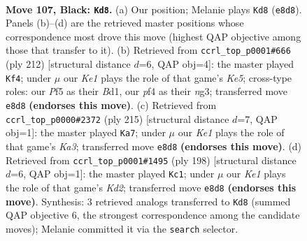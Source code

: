 \documentclass[11pt]{article}
\begin{document}
\clearpage

\begin{figure}[p]\centering
\begin{subfigure}{0.46\textwidth}\centering
\resizebox{\linewidth}{!}{%
\newchessgame
\chessboard[
  setfen={4k1K1/8/8/1b3p2/5P2/8/8/8 b - - 29 107},
  showmover=false,
  pgfstyle=straightmove, color=movearrow, markmove={e8-d8}
]}
\caption{}
\end{subfigure}\hfill
\begin{subfigure}{0.46\textwidth}\centering
\resizebox{\linewidth}{!}{%
\newchessgame
\chessboard[
  setfen={7B/4k3/8/4K3/8/6n1/8/3B4 w - - 11 107},
  showmover=false,
  pgfstyle=straightmove, color=movearrow, markmove={e5-f4}
]}
\caption{}
\end{subfigure}
\\[4pt]
\begin{subfigure}{0.46\textwidth}\centering
\resizebox{\linewidth}{!}{%
\newchessgame
\chessboard[
  setfen={8/6b1/k7/8/2K5/p4N2/P7/8 b - - 73 108},
  showmover=false,
  pgfstyle=straightmove, color=movearrow, markmove={a6-a7}
]}
\caption{}
\end{subfigure}\hfill
\begin{subfigure}{0.46\textwidth}\centering
\resizebox{\linewidth}{!}{%
\newchessgame
\chessboard[
  setfen={4k3/8/8/4p3/8/5P2/B2K4/6b1 w - - 21 100},
  showmover=false,
  pgfstyle=straightmove, color=movearrow, markmove={d2-c1}
]}
\caption{}
\end{subfigure}
\caption{\textbf{Move 107, Black: \texttt{Kd8}.} (a) Our position; Melanie plays \texttt{Kd8} (\texttt{e8d8}). Panels (b)--(d) are the retrieved master positions whose correspondence most drove this move (highest QAP objective among those that transfer to it). (b) Retrieved from \texttt{ccrl\_top\_p0001\#666} (ply 212) [structural distance $d$=6, QAP obj=4]: the master played \texttt{Kf4}; under $\mu$ our \emph{Ke1} plays the role of that game's \emph{Ke5}; cross-type roles: our \emph{P}f5 as their \emph{B}d1, our \emph{p}f4 as their \emph{n}g3; transferred move \texttt{e8d8} \textbf{(endorses this move)}. (c) Retrieved from \texttt{ccrl\_top\_p0000\#2372} (ply 215) [structural distance $d$=7, QAP obj=1]: the master played \texttt{Ka7}; under $\mu$ our \emph{Ke1} plays the role of that game's \emph{Ka3}; transferred move \texttt{e8d8} \textbf{(endorses this move)}. (d) Retrieved from \texttt{ccrl\_top\_p0001\#1495} (ply 198) [structural distance $d$=6, QAP obj=1]: the master played \texttt{Kc1}; under $\mu$ our \emph{Ke1} plays the role of that game's \emph{Kd2}; transferred move \texttt{e8d8} \textbf{(endorses this move)}. Synthesis: 3 retrieved analogs transferred to \texttt{Kd8} (summed QAP objective 6, the strongest correspondence among the candidate moves); Melanie committed it via the \texttt{search} selector.}
\label{fig:thought-m213}
\end{figure}
\end{document}
